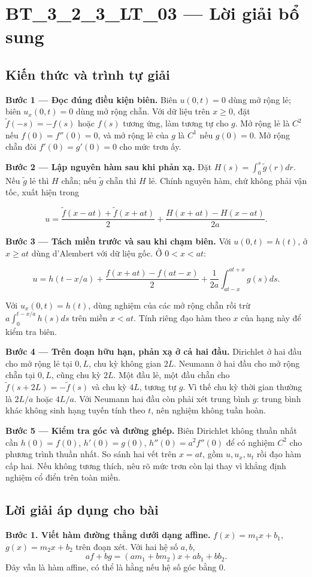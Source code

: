 \documentclass[10pt,a4paper]{article}
\begin{document}
\section*{BT\_3\_2\_3\_LT\_03 — Lời giải bổ sung}
\subsection*{Kiến thức và trình tự giải}
\textbf{Bước 1 — Đọc đúng điều kiện biên.} Biên $u(0,t)=0$ dùng mở rộng lẻ; biên $u_x(0,t)=0$ dùng mở rộng chẵn. Với dữ liệu trên $x\ge0$, đặt $\widetilde f(-s)=-f(s)$ hoặc $f(s)$ tương ứng, làm tương tự cho $g$. Mở rộng lẻ là $C^2$ nếu $f(0)=f''(0)=0$, và mở rộng lẻ của $g$ là $C^1$ nếu $g(0)=0$. Mở rộng chẵn đòi $f'(0)=g'(0)=0$ cho mức trơn ấy.

\textbf{Bước 2 — Lập nguyên hàm sau khi phản xạ.} Đặt $H(s)=\int_0^s\widetilde g(r)dr$. Nếu $\widetilde g$ lẻ thì $H$ chẵn; nếu $\widetilde g$ chẵn thì $H$ lẻ. Chính nguyên hàm, chứ không phải vận tốc, xuất hiện trong


\[
u=\frac{\widetilde f(x-at)+\widetilde f(x+at)}2+\frac{H(x+at)-H(x-at)}{2a}.
\]


\textbf{Bước 3 — Tách miền trước và sau khi chạm biên.} Với $u(0,t)=h(t)$, ở $x\ge at$ dùng d'Alembert với dữ liệu gốc. Ở $0<x<at$:


\[
u=h(t-x/a)+\frac{f(x+at)-f(at-x)}2+\frac1{2a}\int_{at-x}^{at+x}g(s)ds.
\]


Với $u_x(0,t)=h(t)$, dùng nghiệm của các mở rộng chẵn rồi trừ $a\int_0^{t-x/a}h(s)ds$ trên miền $x<at$. Tính riêng đạo hàm theo $x$ của hạng này để kiểm tra biên.

\textbf{Bước 4 — Trên đoạn hữu hạn, phản xạ ở cả hai đầu.} Dirichlet ở hai đầu cho mở rộng lẻ tại $0,L$, chu kỳ không gian $2L$. Neumann ở hai đầu cho mở rộng chẵn tại $0,L$, cũng chu kỳ $2L$. Một đầu lẻ, một đầu chẵn cho $\widetilde f(s+2L)=-\widetilde f(s)$ và chu kỳ $4L$, tương tự $g$. Vì thế chu kỳ thời gian thường là $2L/a$ hoặc $4L/a$. Với Neumann hai đầu còn phải xét trung bình $g$: trung bình khác không sinh hạng tuyến tính theo $t$, nên nghiệm không tuần hoàn.

\textbf{Bước 5 — Kiểm tra góc và đường ghép.} Biên Dirichlet không thuần nhất cần $h(0)=f(0)$, $h'(0)=g(0)$, $h''(0)=a^2f''(0)$ để có nghiệm $C^2$ cho phương trình thuần nhất. So sánh hai vết trên $x=at$, gồm $u,u_x,u_t$ rồi đạo hàm cấp hai. Nếu không tương thích, nêu rõ mức trơn còn lại thay vì khẳng định nghiệm cổ điển trên toàn miền.
\subsection*{Lời giải áp dụng cho bài}
\textbf{Bước 1. Viết hàm đường thẳng dưới dạng affine.} $f(x)=m_1x+b_1$, $g(x)=m_2x+b_2$ trên đoạn xét. Với hai hệ số $a,b$,
\[af+bg=(am_1+bm_2)x+ab_1+bb_2.\]
Đây vẫn là hàm affine, có thể là hằng nếu hệ số góc bằng $0$.
\end{document}
